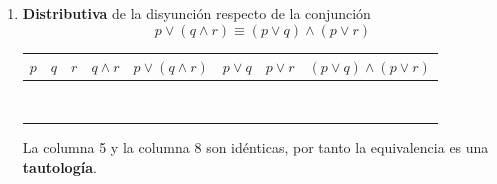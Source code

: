 \begin{enumerate}[label=\alph*)]
\begin{center}
	\renewcommand{\arraystretch}{1.4}
	\begin{tabular}{|c|c|c|c|c||c|c|c|}
		\hline
		$p$ & $q$ & $r$ & $q \vee r$ & $p \land (q \vee r)$ & $p \land q$ & $p \land r$ & $(p \land q) \vee (p \land r)$ \\
		\hline
		\V & \V & \V & \V & \V & \V & \V & \V \\
		\hline
		\V & \V & \F & \V & \V & \V & \F & \V \\
		\hline
		\V & \F & \V & \V & \V & \F & \V & \V \\
		\hline
		\V & \F & \F & \F & \F & \F & \F & \F \\
		\hline
		\F & \V & \V & \V & \F & \F & \F & \F \\
		\hline
		\F & \V & \F & \V & \F & \F & \F & \F \\
		\hline
		\F & \F & \V & \V & \F & \F & \F & \F \\
		\hline
		\F & \F & \F & \F & \F & \F & \F & \F \\
		\hline
	\end{tabular}
\end{center}
\noindent La columna 5 y la columna 8 son idénticas, por tanto la equivalencia es una \textbf{tautología}.

\item \textbf{Distributiva} de la disyunción respecto de la conjunción
\[p \vee (q \land r) \equiv (p \vee q) \land (p \vee r)\]

\begin{center}
	\renewcommand{\arraystretch}{1.4}
	\begin{tabular}{|c|c|c|c|c||c|c|c|}
		\hline
		$p$ & $q$ & $r$ & $q \land r$ & $p \vee (q \land r)$ & $p \vee q$ & $p \vee r$ & $(p \vee q) \land (p \vee r)$ \\
		\hline
		\V & \V & \V & \V & \V & \V & \V & \V \\
		\hline
		\V & \V & \F & \F & \V & \V & \V & \V \\
		\hline
		\V & \F & \V & \F & \V & \V & \V & \V \\
		\hline
		\V & \F & \F & \F & \V & \V & \V & \V \\
		\hline
		\F & \V & \V & \V & \V & \V & \V & \V \\
		\hline
		\F & \V & \F & \F & \F & \V & \F & \F \\
		\hline
		\F & \F & \V & \F & \F & \F & \V & \F \\
		\hline
		\F & \F & \F & \F & \F & \F & \F & \F \\
		\hline
	\end{tabular}
\end{center}
\noindent La columna 5 y la columna 8 son idénticas, por tanto la equivalencia es una \textbf{tautología}.


\end{enumerate}
